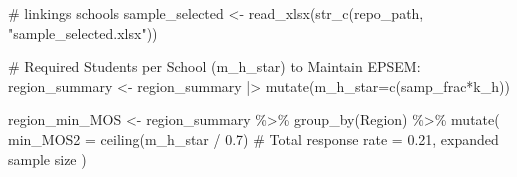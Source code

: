 \documentclass[
  12pt]{article}
\newenvironment{Shaded}{\begin{snugshade}}{\end{snugshade}}
\newcommand{\AttributeTok}[1]{\textcolor[rgb]{0.40,0.45,0.13}{#1}}
\newcommand{\CommentTok}[1]{\textcolor[rgb]{0.37,0.37,0.37}{#1}}
\newcommand{\FloatTok}[1]{\textcolor[rgb]{0.68,0.00,0.00}{#1}}
\newcommand{\FunctionTok}[1]{\textcolor[rgb]{0.28,0.35,0.67}{#1}}
\newcommand{\NormalTok}[1]{\textcolor[rgb]{0.00,0.23,0.31}{#1}}
\newcommand{\OtherTok}[1]{\textcolor[rgb]{0.00,0.23,0.31}{#1}}
\newcommand{\SpecialCharTok}[1]{\textcolor[rgb]{0.37,0.37,0.37}{#1}}
\newcommand{\StringTok}[1]{\textcolor[rgb]{0.13,0.47,0.30}{#1}}
\begin{document}
\begin{Shaded}
\begin{Highlighting}[]
\CommentTok{\# linkings schools}
\NormalTok{sample\_selected }\OtherTok{\textless{}{-}} \FunctionTok{read\_xlsx}\NormalTok{(}\FunctionTok{str\_c}\NormalTok{(repo\_path, }\StringTok{"sample\_selected.xlsx"}\NormalTok{))}

\CommentTok{\# Required Students per School (m\_h\_star) to Maintain EPSEM:}
\NormalTok{region\_summary }\OtherTok{\textless{}{-}}\NormalTok{ region\_summary }\SpecialCharTok{|\textgreater{}} 
  \FunctionTok{mutate}\NormalTok{(}\AttributeTok{m\_h\_star=}\FunctionTok{c}\NormalTok{(samp\_frac}\SpecialCharTok{*}\NormalTok{k\_h))}


\NormalTok{region\_min\_MOS }\OtherTok{\textless{}{-}}\NormalTok{ region\_summary }\SpecialCharTok{\%\textgreater{}\%}
  \FunctionTok{group\_by}\NormalTok{(Region) }\SpecialCharTok{\%\textgreater{}\%}
  \FunctionTok{mutate}\NormalTok{(}
    \AttributeTok{min\_MOS2 =} \FunctionTok{ceiling}\NormalTok{(m\_h\_star }\SpecialCharTok{/}  \FloatTok{0.7}\NormalTok{)  }\CommentTok{\# Total response rate = 0.21, expanded sample size}
\NormalTok{  )}


\end{Highlighting}
\end{Shaded}
\end{document}
